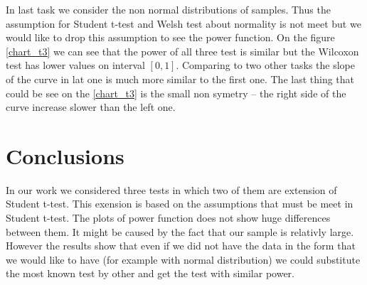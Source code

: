 \documentclass{article}
\begin{document}
In last task we consider the non normal distributions of samples. Thus the assumption for Student t-test and Welsh test about normality is not meet but we would like to drop this assumption to see the power function.  On the figure \ref{chart_t3} we can see that the power of all three test is similar but the Wilcoxon test has lower values on interval $[0,1]$. Comparing to two other tasks the slope of the curve in lat one is much more similar to the first one. The last thing that could be see on the \ref{chart_t3} is the small non symetry -- the right side of the curve increase slower than the left one. 

\section{Conclusions}
In our work we considered three tests in which two of them are extension of Student t-test. This exension is based on the assumptions that must be meet in Student t-test. The plots of power function does not show huge differences between them. It might be caused by the fact that our sample is relativly large. However the results show that even if we did not have the data in the form that we would like to have (for example with normal distribution) we could substitute the most known test by other and get the test with similar power.
\end{document}
